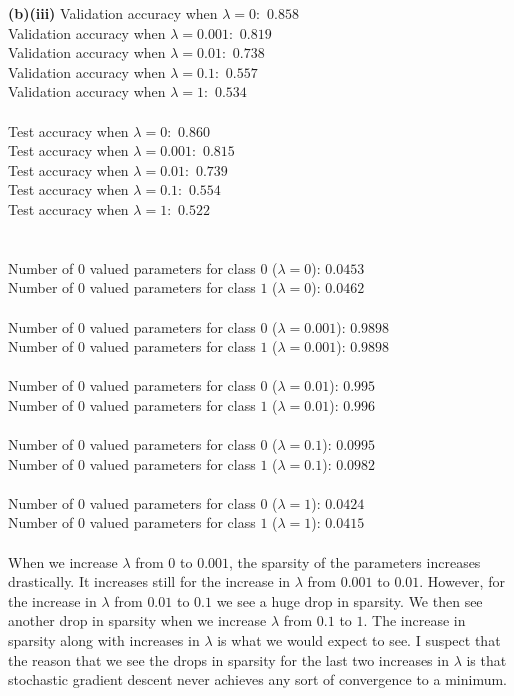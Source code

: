 \documentclass[submit]{harvardml}
\begin{document}
\textbf{(b)(iii)} Validation accuracy when $\lambda=0:$ $0.858$\\
Validation accuracy when $\lambda=0.001:$ $0.819$\\
Validation accuracy when $\lambda=0.01:$ $0.738$\\
Validation accuracy when $\lambda=0.1:$ $0.557$\\
Validation accuracy when $\lambda=1:$ $0.534$\\\\
Test accuracy when $\lambda=0:$ $0.860$\\
Test accuracy when $\lambda=0.001:$ $0.815$\\
Test accuracy when $\lambda=0.01:$ $0.739$\\
Test accuracy when $\lambda=0.1:$ $0.554$\\
Test accuracy when $\lambda=1:$ $0.522$\\\\\\
Number of $0$ valued parameters for class $0$ ($\lambda=0$): $0.0453$\\
Number of $0$ valued parameters for class $1$ ($\lambda=0$): $0.0462$\\\\
Number of $0$ valued parameters for class $0$ ($\lambda=0.001$): $0.9898$\\
Number of $0$ valued parameters for class $1$ ($\lambda=0.001$): $0.9898$\\\\
Number of $0$ valued parameters for class $0$ ($\lambda=0.01$): $0.995$\\
Number of $0$ valued parameters for class $1$ ($\lambda=0.01$): $0.996$\\\\
Number of $0$ valued parameters for class $0$ ($\lambda=0.1$): $0.0995$\\
Number of $0$ valued parameters for class $1$ ($\lambda=0.1$): $0.0982$\\\\
Number of $0$ valued parameters for class $0$ ($\lambda=1$): $0.0424$\\
Number of $0$ valued parameters for class $1$ ($\lambda=1$): $0.0415$\\\\
When we increase $\lambda$ from $0$ to $0.001$, the sparsity of the parameters increases drastically. It increases still for the increase in $\lambda$ from $0.001$ to $0.01$. However, for the increase in $\lambda$ from $0.01$ to $0.1$ we see a huge drop in sparsity. We then see another drop in sparsity when we increase $\lambda$ from $0.1$ to $1$. The increase in sparsity along with increases in $\lambda$ is what we would expect to see. I suspect that the reason that we see the drops in sparsity for the last two increases in $\lambda$ is that stochastic gradient descent never achieves any sort of convergence to a minimum.
\end{document}
